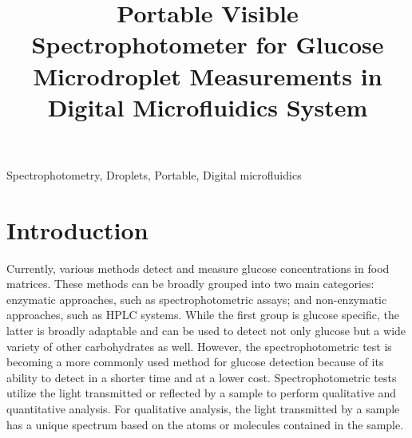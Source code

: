 \documentclass[conference]{IEEEtran}
\begin{document}
\makeatletter
\newcommand{\newlineauthors}{%
  \end{@IEEEauthorhalign}\hfill\mbox{}\par
  \mbox{}\hfill\begin{@IEEEauthorhalign}
}
\makeatother

\title{Portable Visible Spectrophotometer for Glucose Microdroplet Measurements in Digital Microfluidics System}

\author{
}

\maketitle

\begin{abstract}
    
\end{abstract}

\begin{IEEEkeywords}
    Spectrophotometry, Droplets, Portable, Digital microfluidics
\end{IEEEkeywords}

\section{Introduction}
Currently, various methods detect and measure glucose concentrations in food matrices.
These methods can be broadly grouped into two main categories: enzymatic approaches, such as spectrophotometric assays; and non-enzymatic approaches, such as HPLC systems.
While the first group is glucose specific, the latter is broadly adaptable and can be used to detect not only glucose but a wide variety of other carbohydrates as well\cite{b1}.
However, the spectrophotometric test is becoming a more commonly used method for glucose detection because of its ability to detect in a shorter time and at a lower cost.
Spectrophotometric tests utilize the light transmitted or reflected by a sample to perform qualitative and quantitative analysis.
For qualitative analysis, the light transmitted by a sample has a unique spectrum based on the atoms or molecules contained in the sample.  
\end{document}
